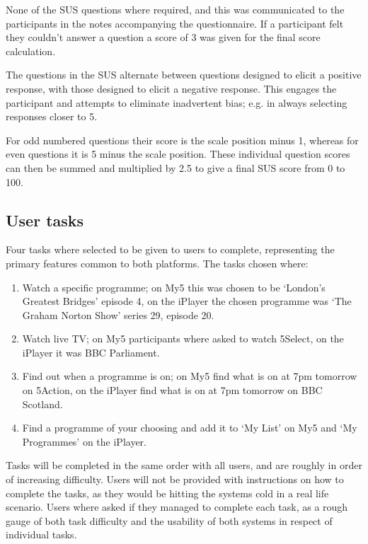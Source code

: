 \documentclass[12pt,a4paper,x11names]{article}
\begin{document}
None of the SUS questions where required, and this was communicated to the participants in the notes accompanying the questionnaire. If a participant felt they couldn't answer a question a score of 3 was given for the final score calculation\cite{sus}.

The questions in the SUS alternate between questions designed to elicit a positive response, with those designed to elicit a negative response. This engages the participant and attempts to eliminate inadvertent bias; e.g. in always selecting responses closer to 5.

For odd numbered questions their score is the scale position minus 1, whereas for even questions it is 5 minus the scale position. These individual question scores can then be summed and multiplied by 2.5 to give a final SUS score from 0 to 100.

\subsection{User tasks}
Four tasks where selected to be given to users to complete, representing the primary features common to both platforms. The tasks chosen where:

\begin{enumerate}
\item Watch a specific programme; on My5 this was chosen to be `London's Greatest Bridges' episode 4, on the iPlayer the chosen programme was `The Graham Norton Show' series 29, episode 20.
\item Watch live TV; on My5 participants where asked to watch 5Select, on the iPlayer it was BBC Parliament.
\item Find out when a programme is on; on My5 find what is on at 7pm tomorrow on 5Action, on the iPlayer find what is on at 7pm tomorrow on BBC Scotland.
\item Find a programme of your choosing and add it to `My List' on My5 and `My Programmes' on the iPlayer.
\end{enumerate}

Tasks will be completed in the same order with all users, and are roughly in order of increasing difficulty\cite{lewistask}. Users will not be provided with instructions on how to complete the tasks, as they would be hitting the systems cold in a real life scenario. Users where asked if they managed to complete each task, as a rough gauge of both task difficulty and the usability of both systems in respect of individual tasks.
\end{document}
